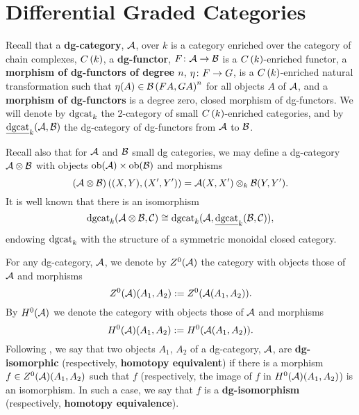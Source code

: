 \chapter{Differential Graded Categories}\label{section: background on dgcats}
Recall that a \textbf{dg-category}, \(\mathcal{A}\), over \(k\) is a category enriched over the category of chain complexes, \(C\left(k\right)\), a \textbf{dg-functor}, \(F \colon \mathcal{A} \rightarrow \mathcal{B}\) is a \(C\left(k\right)\)-enriched functor, a \textbf{morphism of dg-functors of degree \(n\)}, \(\eta \colon F \rightarrow G\), is a \(C\left(k\right)\)-enriched natural transformation such that \(\eta(A) \in \mathcal{B}\left(FA, GA\right)^n\) for all objects \(A\) of \(\mathcal {\mathcal{A}}\), and a \textbf{morphism of dg-functors} is a degree zero, closed morphism of dg-functors.
We will denote by \(\operatorname{dgcat}_k\) the 2-category of small \(C\left(k\right)\)-enriched categories, and by \(\underline{\operatorname{dgcat}}_{k}(\mathcal{A},\mathcal{B})\) the dg-category of dg-functors from \(\mathcal{A}\) to \(\mathcal{B}\).

Recall also that for \(\mathcal{A}\) and \(\mathcal{B}\) small dg categories, we may define a dg-category \(\mathcal{A} \otimes \mathcal{B}\) with objects \(\operatorname{ob}(\mathcal{A}) \times \operatorname{ob}(\mathcal{B})\) and morphisms
\[(\mathcal{A} \otimes \mathcal{B})\left((X,Y), (X^\prime,Y^\prime)\right) = \mathcal{A}(X,X^\prime) \otimes_k \mathcal{B}(Y, Y^\prime).\]
It is well known that there is an isomorphism
\[\operatorname{dgcat}_k(\mathcal{A} \otimes \mathcal{B}, \mathcal{C}) \cong \operatorname{dgcat}_k(\mathcal{A}, \underline{\operatorname{dgcat}}_{k}(\mathcal{B}, \mathcal{C})),\]
endowing \(\operatorname{dgcat}_k\) with the structure of a symmetric monoidal closed category.

For any dg-category, \(\mathcal{A}\), we denote by \(Z^0(\mathcal{A})\) the category with objects those of \(\mathcal{A}\) and morphisms
\[Z^0(\mathcal{A})(A_1, A_2) := Z^0(\mathcal{A}(A_1,A_2)).\]
By \(H^0(\mathcal{A})\) we denote the category with objects those of \(\mathcal{A}\) and morphisms
\[H^0(\mathcal{A})(A_1, A_2) := H^0(\mathcal{A}(A_1,A_2)).\]
Following \cite{CS15}, we say that two objects \(A_1\), \(A_2\) of a dg-category, \(\mathcal{A}\), are \textbf{dg-isomorphic} (respectively, \textbf{homotopy equivalent}) if there is a morphism \(f \in Z^0(\mathcal{A})(A_1, A_2)\) such that \(f\) (respectively, the image of \(f\) in \(H^0(\mathcal{A})(A_1, A_2)\)) is an isomorphism.
In such a case, we say that \(f\) is a \textbf{dg-isomorphism} (respectively, \textbf{homotopy equivalence}).

